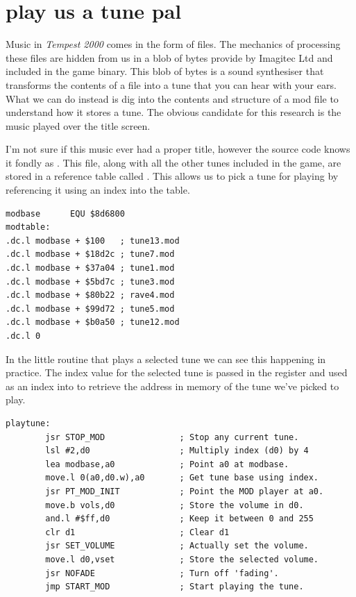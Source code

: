\chapter{play us a tune pal}
\label{sec:listing}
\lhead[tempest 2000]{}
\lstset{style=68KStyle}

Music in \textit{Tempest 2000} comes in the form of  files. The mechanics of
processing these files are hidden from us in a blob of bytes provide by Imagitec Ltd
and included in the game binary. This blob of bytes is a sound synthesiser that transforms
the contents of a  file into a tune that you can hear with your ears. What we can
do instead is dig into the contents and structure of a mod file to understand how it stores
a tune. The obvious candidate for this research is the music played over the title screen.

I'm not sure if this music ever had a proper title, however the source code knows it fondly
as . This file, along with all the other tunes included in the game, are
stored in a reference table called . This allows us to pick a tune for playing
by referencing it using an index into the table. 

\begin{lstlisting}
modbase      EQU $8d6800
modtable:
.dc.l modbase + $100   ; tune13.mod
.dc.l modbase + $18d2c ; tune7.mod
.dc.l modbase + $37a04 ; tune1.mod
.dc.l modbase + $5bd7c ; tune3.mod
.dc.l modbase + $80b22 ; rave4.mod
.dc.l modbase + $99d72 ; tune5.mod
.dc.l modbase + $b0a50 ; tune12.mod
.dc.l 0
\end{lstlisting}

In the little routine that plays a selected tune we can see this happening in practice. The
index value for the selected tune is passed in the  register and used as an index
into  to retrieve the address in memory of the tune we've picked to play.
\clearpage
\begin{lstlisting}
playtune:
        jsr STOP_MOD               ; Stop any current tune.
        lsl #2,d0                  ; Multiply index (d0) by 4
        lea modbase,a0             ; Point a0 at modbase.
        move.l 0(a0,d0.w),a0       ; Get tune base using index.
        jsr PT_MOD_INIT            ; Point the MOD player at a0.
        move.b vols,d0             ; Store the volume in d0.
        and.l #$ff,d0              ; Keep it between 0 and 255
        clr d1                     ; Clear d1
        jsr SET_VOLUME             ; Actually set the volume.
        move.l d0,vset             ; Store the selected volume.
        jsr NOFADE                 ; Turn off 'fading'.
        jmp START_MOD              ; Start playing the tune.
\end{lstlisting}

